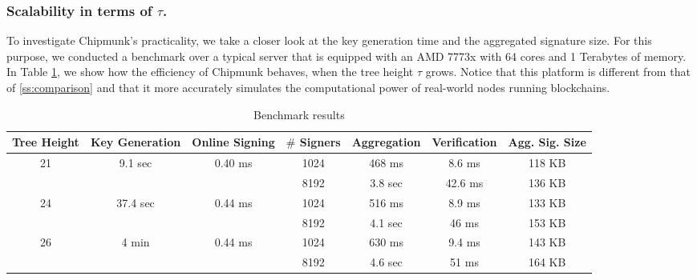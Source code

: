 \subsubsection{Scalability in terms of $\tau$.}
To investigate Chipmunk's practicality, we take a closer look at the key generation time and the aggregated signature size.
For this purpose, we conducted a benchmark over a typical server that is equipped with an AMD 7773x with 64 cores and 1 Terabytes of memory.
In Table \ref{tab:bench_results}, we show how the efficiency of Chipmunk behaves, when the tree height $\tau$ grows.
Notice that this platform is different from that of \autoref{ss:comparison} and that it more accurately simulates the computational power of real-world nodes running blockchains.

\begin{table}[t]\centering
  \begin{tabular}{ccccccc}
      Tree Height         & Key Generation            & Online Signing\footnotemark        
      & $\#$ Signers  
                                                                                            &  Aggregation & Verification  & Agg. Sig. Size  \\ \toprule
      \multirow{2}{*}{21} & \multirow{2}{*}{9.1 sec}  & \multirow{2}{*}{0.40 ms}  & 1024    &   468 ms     &  8.6 ms       & 118 KB     \\%
                          &                           &                           & 8192    &   3.8 sec    &  42.6 ms      & 136 KB     \\\hline

      \multirow{2}{*}{24} & \multirow{2}{*}{37.4 sec} & \multirow{2}{*}{0.44 ms}  & 1024    &   516 ms     &  8.9 ms       & 133 KB     \\%
                          &                           &                           & 8192    &   4.1 sec    &  46 ms        & 153 KB     \\\hline

      \multirow{2}{*}{26} & \multirow{2}{*}{  4 min}  & \multirow{2}{*}{0.44 ms}  & 1024    &   630 ms     &  9.4 ms       & 143 KB     \\%
                          &                           &                           & 8192    &   4.6 sec    &  51 ms        & 164 KB     \\\bottomrule

  \end{tabular}\\
  \caption{Benchmark results}
  \label{tab:bench_results}
\end{table}
